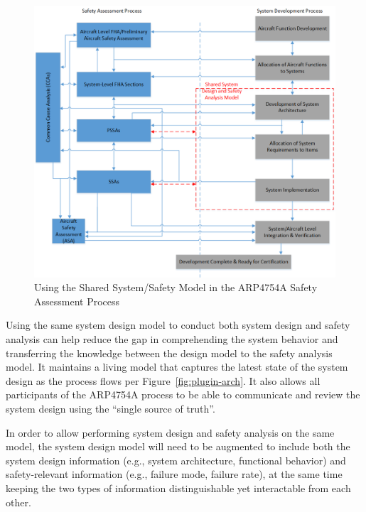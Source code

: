 \begin{figure}[h!]
	\vspace{-0.19in}
	\begin{center}
		\includegraphics[trim=0 9 0 5,clip,width=1.0\textwidth]{images/Safety_Assessment_Process_update.png}
	\end{center}
	\caption{Using the Shared System/Safety Model in the ARP4754A Safety Assessment Process}
	\label{fig:proposed_safety_process}
\end{figure}

Using the same system design model to conduct both system design and safety analysis can help reduce the gap in comprehending the system behavior and transferring the knowledge between the design model to the safety analysis model. It maintains a living model that captures the latest state of the system design as the process flows per Figure~\ref{fig:plugin-arch}. It also allows all participants of the ARP4754A process to be able to communicate and review the system design using the ``single source of truth''.

In order to allow performing system design and safety analysis on the same model, the system design model will need to be augmented to include both the system design information (e.g., system architecture, functional behavior) and safety-relevant information (e.g., failure mode, failure rate), at the same time keeping the two types of information distinguishable yet interactable from each other.

